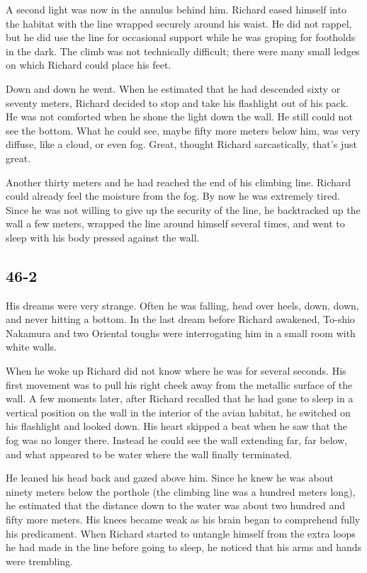 \documentclass[]{article}
\begin{document}
{A second light was now in the annulus behind him.  Richard eased himself into the habitat with the line wrapped securely around his waist.  He did not rappel, but he did use the line for occasional support while he was groping for footholds in the dark.  The climb was not technically difficult; there were many small ledges on which Richard could place his feet.

Down and down he went.  When he estimated that he had descended sixty or seventy meters, Richard decided to stop and take his flashlight out of his pack.  He was not comforted when he shone the light down the wall.  He still could not see the bottom.  What he could see, maybe fifty more meters below him, was very diffuse, like a cloud, or even fog.  Great, thought Richard sarcastically, that’s just great.

Another thirty meters and he had reached the end of his climbing line.  Richard could already feel the moisture from the fog.  By now he was extremely tired.  Since he was not willing to give up the security of the line, he backtracked up the wall a few meters, wrapped the line around himself several times, and went to sleep with his body pressed against the wall.


\subsection*{46-2}

His dreams were very strange.  Often he was falling, head over heels, down, down, and never hitting a bottom.  In the last dream before Richard awakened, To-shio Nakamura and two Oriental toughs were interrogating him in a small room with white walls.

When he woke up Richard did not know where he was for several seconds.  His first movement was to pull his right cheek away from the metallic surface of the wall.  A few moments later, after Richard recalled that he had gone to sleep in a vertical position on the wall in the interior of the avian habitat, he switched on his flashlight and looked down.  His heart skipped a beat when he saw that the fog was no longer there.  Instead he could see the wall extending far, far below, and what appeared to be water where the wall finally terminated.

He leaned his head back and gazed above him.  Since he knew he was about ninety meters below the porthole (the climbing line was a hundred meters long), he estimated that the distance down to the water was about two hundred and fifty more meters.  His knees became weak as his brain began to comprehend fully his predicament.  When Richard started to untangle himself from the extra loops he had made in the line before going to sleep, he noticed that his arms and hands were trembling.

}
\end{document}
